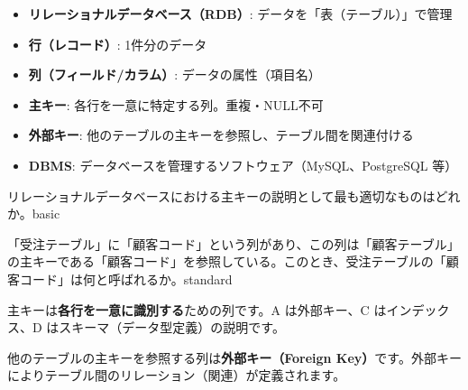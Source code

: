\begin{keypoint}
\begin{itemize}
  \item \textbf{リレーショナルデータベース（RDB）}: データを「表（テーブル）」で管理
  \item \textbf{行（レコード）}: 1件分のデータ
  \item \textbf{列（フィールド/カラム）}: データの属性（項目名）
  \item \textbf{主キー}: 各行を一意に特定する列。重複・NULL不可
  \item \textbf{外部キー}: 他のテーブルの主キーを参照し、テーブル間を関連付ける
  \item \textbf{DBMS}: データベースを管理するソフトウェア（MySQL、PostgreSQL 等）
\end{itemize}
\end{keypoint}


\begin{mondai}{リレーショナルデータベースにおける主キーの説明として最も適切なものはどれか。}{basic}
\end{mondai}

\begin{mondai}{「受注テーブル」に「顧客コード」という列があり、この列は「顧客テーブル」の主キーである「顧客コード」を参照している。このとき、受注テーブルの「顧客コード」は何と呼ばれるか。}{standard}
\end{mondai}

\kaitoupage


\begin{kaisetsu}
主キーは\textbf{各行を一意に識別する}ための列です。A は外部キー、C はインデックス、D はスキーマ（データ型定義）の説明です。
\end{kaisetsu}


\begin{kaisetsu}
他のテーブルの主キーを参照する列は\textbf{外部キー（Foreign Key）}です。外部キーによりテーブル間のリレーション（関連）が定義されます。
\end{kaisetsu}

